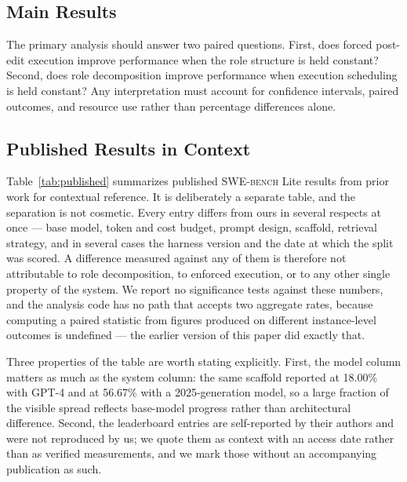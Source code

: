 \documentclass[journal]{IEEEtran}
\newcommand{\agentforge}{\textsc{AgentForge}}
\newcommand{\swebench}{\textsc{SWE-bench}}
\begin{document}
\subsection{Main Results}

\begin{table}[t]
\centering
\caption{\swebench{} Lite results and generation-stage statistics on the seeded 50-instance subset. Official resolution is reported only where a saved official harness report is available; ungraded configurations are marked ``Not graded.'' The \agentforge{} confidence interval is exact Clopper--Pearson. Patch rate, mean cost, and mean executions are computed per attempted task from the released run records.}
\label{tab:main}
\resizebox{\linewidth}{!}{}
\end{table}
\FloatBarrier

The primary analysis should answer two paired questions. First, does forced post-edit execution improve performance when the role structure is held constant? Second, does role decomposition improve performance when execution scheduling is held constant? Any interpretation must account for confidence intervals, paired outcomes, and resource use rather than percentage differences alone.

\subsection{Published Results in Context}

Table~\ref{tab:published} summarizes published \swebench{} Lite results from prior work for contextual reference. It is deliberately a separate table, and the separation is not cosmetic. Every entry differs from ours in several respects at once --- base model, token and cost budget, prompt design, scaffold, retrieval strategy, and in several cases the harness version and the date at which the split was scored. A difference measured against any of them is therefore not attributable to role decomposition, to enforced execution, or to any other single property of the system. We report no significance tests against these numbers, and the analysis code has no path that accepts two aggregate rates, because computing a paired statistic from figures produced on different instance-level outcomes is undefined --- the earlier version of this paper did exactly that.

Three properties of the table are worth stating explicitly. First, the model column matters as much as the system column: the same scaffold reported at 18.00\% with GPT-4 and at 56.67\% with a 2025-generation model, so a large fraction of the visible spread reflects base-model progress rather than architectural difference. Second, the leaderboard entries are self-reported by their authors and were not reproduced by us; we quote them as context with an access date rather than as verified measurements, and we mark those without an accompanying publication as such.
\end{document}
